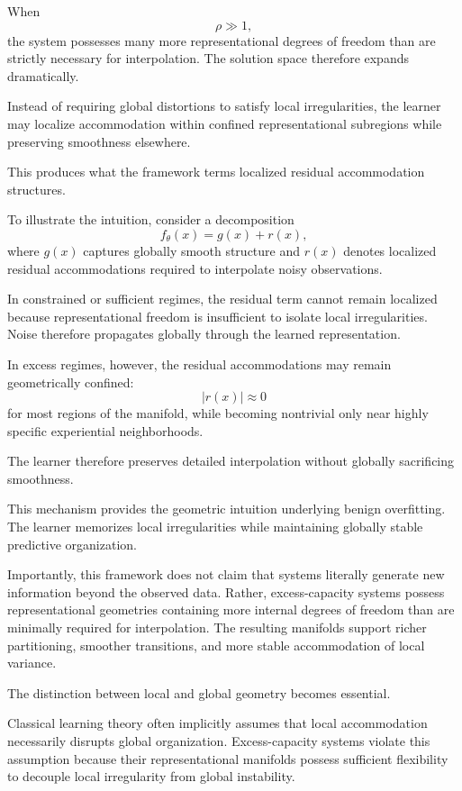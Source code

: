 \documentclass[12pt,a4paper]{article}
\begin{document}
When
\[
\rho \gg 1,
\]
the system possesses many more representational degrees of freedom than are strictly necessary for interpolation. The solution space therefore expands dramatically.

Instead of requiring global distortions to satisfy local irregularities, the learner may localize accommodation within confined representational subregions while preserving smoothness elsewhere.

This produces what the framework terms localized residual accommodation structures.

To illustrate the intuition, consider a decomposition
\[
f_\theta(x) = g(x) + r(x),
\]
where \(g(x)\) captures globally smooth structure and \(r(x)\) denotes localized residual accommodations required to interpolate noisy observations.

In constrained or sufficient regimes, the residual term cannot remain localized because representational freedom is insufficient to isolate local irregularities. Noise therefore propagates globally through the learned representation.

In excess regimes, however, the residual accommodations may remain geometrically confined:
\[
|r(x)| \approx 0
\]
for most regions of the manifold, while becoming nontrivial only near highly specific experiential neighborhoods.

The learner therefore preserves detailed interpolation without globally sacrificing smoothness.

This mechanism provides the geometric intuition underlying benign overfitting. The learner memorizes local irregularities while maintaining globally stable predictive organization.

Importantly, this framework does not claim that systems literally generate new information beyond the observed data. Rather, excess-capacity systems possess representational geometries containing more internal degrees of freedom than are minimally required for interpolation. The resulting manifolds support richer partitioning, smoother transitions, and more stable accommodation of local variance.

The distinction between local and global geometry becomes essential.

Classical learning theory often implicitly assumes that local accommodation necessarily disrupts global organization. Excess-capacity systems violate this assumption because their representational manifolds possess sufficient flexibility to decouple local irregularity from global instability.
\end{document}
